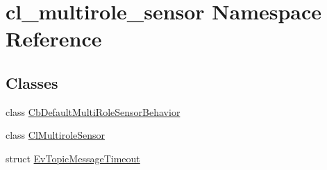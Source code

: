 \hypertarget{namespacecl__multirole__sensor}{}\section{cl\+\_\+multirole\+\_\+sensor Namespace Reference}
\label{namespacecl__multirole__sensor}
\subsection*{Classes}
\begin{DoxyCompactItemize}
\item 
class \hyperlink{classcl__multirole__sensor_1_1CbDefaultMultiRoleSensorBehavior}{Cb\+Default\+Multi\+Role\+Sensor\+Behavior}
\item 
class \hyperlink{classcl__multirole__sensor_1_1ClMultiroleSensor}{Cl\+Multirole\+Sensor}
\item 
struct \hyperlink{structcl__multirole__sensor_1_1EvTopicMessageTimeout}{Ev\+Topic\+Message\+Timeout}
\end{DoxyCompactItemize}
